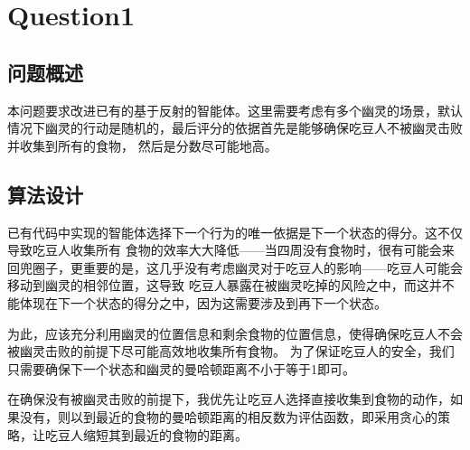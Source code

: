 \chapter{Question1}
\section{问题概述}
%
%
本问题要求改进已有的基于反射的智能体。这里需要考虑有多个幽灵的场景，默认情况下幽灵的行动是随机的，最后评分的依据首先是能够确保吃豆人不被幽灵击败并收集到所有的食物，
然后是分数尽可能地高。


%
%

%
%

\section{算法设计}
已有代码中实现的智能体选择下一个行为的唯一依据是下一个状态的得分。这不仅导致吃豆人收集所有
食物的效率大大降低——当四周没有食物时，很有可能会来回兜圈子，更重要的是，这几乎没有考虑幽灵对于吃豆人的影响——吃豆人可能会移动到幽灵的相邻位置，这导致
吃豆人暴露在被幽灵吃掉的风险之中，而这并不能体现在下一个状态的得分之中，因为这需要涉及到再下一个状态。

为此，应该充分利用幽灵的位置信息和剩余食物的位置信息，使得确保吃豆人不会被幽灵击败的前提下尽可能高效地收集所有食物。
为了保证吃豆人的安全，我们只需要确保下一个状态和幽灵的曼哈顿距离不小于等于1即可。

在确保没有被幽灵击败的前提下，我优先让吃豆人选择直接收集到食物的动作，如果没有，则以到最近的食物的曼哈顿距离的相反数为评估函数，即采用贪心的策略，让吃豆人缩短其到最近的食物的距离。
%
%
